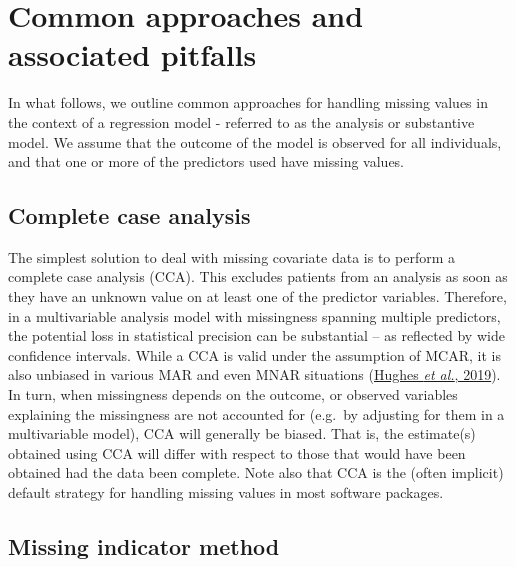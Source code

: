 \documentclass[
  letterpaper,
  DIV=11,
  numbers=noendperiod]{scrreprt}
\begin{document}
\hypertarget{common-approaches-and-associated-pitfalls}{%
\section{Common approaches and associated
pitfalls}\label{common-approaches-and-associated-pitfalls}}

In what follows, we outline common approaches for handling missing
values in the context of a regression model - referred to as the
analysis or substantive model. We assume that the outcome of the model
is observed for all individuals, and that one or more of the predictors
used have missing values.

\hypertarget{complete-case-analysis}{%
\subsection{Complete case analysis}\label{complete-case-analysis}}

The simplest solution to deal with missing covariate data is to perform
a complete case analysis (CCA). This excludes patients from an analysis
as soon as they have an unknown value on at least one of the predictor
variables. Therefore, in a multivariable analysis model with missingness
spanning multiple predictors, the potential loss in statistical
precision can be substantial -- as reflected by wide confidence
intervals. While a CCA is valid under the assumption of MCAR, it is also
unbiased in various MAR and even MNAR situations
(\protect\hyperlink{ref-hughesAccountingMissingData2019}{Hughes \emph{et
al.}, 2019}). In turn, when missingness depends on the outcome, or
observed variables explaining the missingness are not accounted for
(e.g.~by adjusting for them in a multivariable model), CCA will
generally be biased. That is, the estimate(s) obtained using CCA will
differ with respect to those that would have been obtained had the data
been complete. Note also that CCA is the (often implicit) default
strategy for handling missing values in most software packages.

\hypertarget{missing-indicator-method}{%
\subsection{Missing indicator method}\label{missing-indicator-method}}
\end{document}
